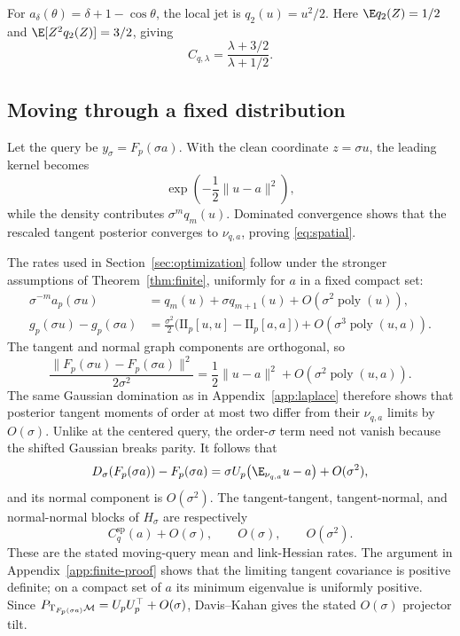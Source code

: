 For $a_\delta(\theta)=\delta+1-\cos\theta$, the local jet is
$q_2(u)=u^2/2$.  Here $\E q_2(Z)=1/2$ and
$\E[Z^2q_2(Z)]=3/2$, giving
\[
  C_{q,\lambda}=\frac{\lambda+3/2}{\lambda+1/2}.
\]

\subsection{Moving through a fixed distribution}

Let the query be $y_\sigma=F_p(\sigma a)$.  With the clean coordinate
$z=\sigma u$, the leading kernel becomes
\[
  \exp\!\left(-\frac12\|u-a\|^2\right),
\]
while the density contributes $\sigma^m q_m(u)$.  Dominated convergence shows that the rescaled tangent posterior converges to $\nu_{q,a}$, proving \eqref{eq:spatial}.

The rates used in Section~\ref{sec:optimization} follow under the stronger assumptions of Theorem~\ref{thm:finite}, uniformly for $a$ in a fixed compact set:
\begin{align}
  \sigma^{-m}a_p(\sigma u)
  &=q_m(u)+\sigma q_{m+1}(u)
    +O(\sigma^2\operatorname{poly}(u)),\\
  g_p(\sigma u)-g_p(\sigma a)
  &=\frac{\sigma^2}{2}
    \bigl(\mathrm{II}_p[u,u]-\mathrm{II}_p[a,a]\bigr)
    +O(\sigma^3\operatorname{poly}(u,a)).
\end{align}
The tangent and normal graph components are orthogonal, so
\begin{equation}
  \frac{\|F_p(\sigma u)-F_p(\sigma a)\|^2}{2\sigma^2}
  =\frac12\|u-a\|^2+O(\sigma^2\operatorname{poly}(u,a)).
\end{equation}
The same Gaussian domination as in Appendix~\ref{app:laplace} therefore shows that posterior tangent moments of order at most two differ from their $\nu_{q,a}$ limits by $O(\sigma)$.  Unlike at the centered query, the order-$\sigma$ term need not vanish because the shifted Gaussian breaks parity.  It follows that
\begin{equation}
  D_\sigma(F_p(\sigma a))-F_p(\sigma a)
  =\sigma U_p\bigl(\E_{\nu_{q,a}}u-a\bigr)+O(\sigma^2),
\end{equation}
and its normal component is $O(\sigma^2)$.  The tangent-tangent, tangent-normal, and normal-normal blocks of $H_\sigma$ are respectively
\begin{equation}
  C_q^{\mathrm{sp}}(a)+O(\sigma),\qquad
  O(\sigma),\qquad O(\sigma^2).
\end{equation}
These are the stated moving-query mean and link-Hessian rates.  The argument in Appendix~\ref{app:finite-proof} shows that the limiting tangent covariance is positive definite; on a compact set of $a$ its minimum eigenvalue is uniformly positive.  Since
$P_{\mathrm{T}_{F_p(\sigma a)}\mathcal{M}}=U_pU_p^\top+O(\sigma)$, Davis--Kahan gives the stated $O(\sigma)$ projector tilt.

